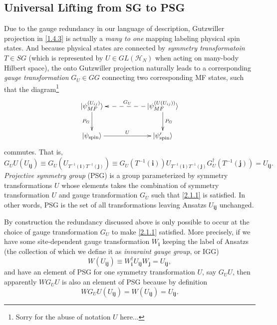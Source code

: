 \documentclass[10pt,nofootinbib]{revtex4}
\newcounter{Def}[section]
\newenvironment{Def}[1][]{{\par\normalfont\bfseries \underline{Definition~\stepcounter{Def}\arabic{Def}.}~#1~~}}{\par}
\begin{document}
	\subsection{Universal Lifting from SG to PSG}
	Due to the gauge redundancy in our language of description, Gutzwiller projection in \eqref{1.4.3} is actually a \emph{many to one} mapping labeling physical spin states. And because physical states are connected by \emph{symmetry transformatoin} $T\in SG$ (which is represented by $U\in GL(\mathcal{H}_N)$ when acting on many-body Hilbert space), the onto Gutzwiller projection naturally leads to a corresponding \emph{gauge transformation} $G_U\in GG$ connecting two corresponding MF states, such that the diagram\footnote{Sorry for the abuse of notation $U$ here...}
	\begin{equation*}
		\xymatrix@C=2cm{|\psi_{MF}^{(U_{ij})}\rangle \ar[d]_{P_G} & |\psi_{MF}^{(U(U_{ij}))}\rangle \ar@{-->}[l]_{G_U} \ar[d]^{P_G}\\ |\psi_{\text{spin}}\rangle \ar[r]^{U} & |\psi_{\text{spin}}'\rangle}
	\end{equation*}
	commutes. That is,
	\begin{equation}\label{2.1.1}
		G_UU(U_{\bm{ij}})\equiv G_U(U_{T^{-1}(\bm{i})T^{-1}(\bm{j})})\equiv G_U(T^{-1}(\bm{i}))U_{T^{-1}(\bm{i})T^{-1}(\bm{j})}G_U^\dagger(T^{-1}(\bm{j}))=U_{\bm{ij}}.
	\end{equation}
	\begin{Def}[(PSG)]
		\emph{Projective symmetry group} (PSG) is a group parameterized by symmetry transformations $U$ whose elements takes the combination of symmetry transformation $U$ and gauge transformation $G_U$ such that \eqref{2.1.1} is satisfied. In other words, PSG is the set of all transformations leaving Ansatzs $U_{\bm{ij}}$ unchanged.
	\end{Def}
	By construction the redundancy discussed above is only possible to occur at the choice of gauge transformation $G_U$ to make \eqref{2.1.1} satisfied. More precisely, if we have some site-dependent gauge transformation $W_{\bm{i}}$ keeping the label of Ansatzs (the collection of which we define it as \emph{invaraint gauge group}, or IGG)
	\begin{equation}\label{2.1.2}
		W(U_{\bm{ij}})\equiv W_{\bm{i}}^\dagger U_{\bm{ij}} W_{\bm{j}}=U_{\bm{ij}},
	\end{equation}
	and have an element of PSG for one symmetry transformation $U$, say $G_UU$, then apparently $WG_UU$ is also an element of PSG because by definition
	\begin{equation*}
		WG_UU(U_{\bm{ij}})=W(U_{\bm{ij}})=U_{\bm{ij}}.
	\end{equation*} 
\end{document}
